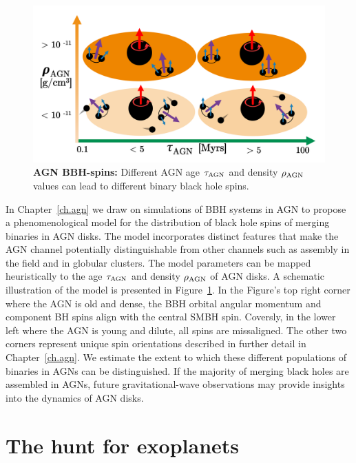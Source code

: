 \begin{figure}
\begin{center}
  \centerline{\includegraphics[width=1.\linewidth]{src/figures/agn_spins.png}}
  \caption{\textbf{AGN BBH-spins:} Different AGN age $\tau_{\rm AGN}$ and density $\rho_{\rm AGN}$ values can lead to different binary black hole spins. }
  \label{fig:agn_spins}
\end{center}
\end{figure}


In Chapter~\ref{ch.agn} we draw on simulations of BBH systems in AGN to propose a phenomenological model for the distribution of black hole spins of merging binaries in AGN disks. 
The model incorporates distinct features that make the AGN channel potentially distinguishable from other channels such as assembly in the field and in globular clusters. 
The model parameters can be mapped heuristically to the age $\tau_{\rm AGN}$ and density $\rho_{\rm AGN}$ of AGN disks. 
A schematic illustration of the model is presented in Figure~\ref{fig:agn_spins}. 
In the Figure's top right corner where the AGN is old and dense, the BBH orbital angular momentum and component BH spins align with the central SMBH spin. 
Coversly, in the lower left where the AGN is young and dilute, all spins are missaligned. The other two corners represent unique spin orientations described in further detail in Chapter~\ref{ch.agn}.
We estimate the extent to which these different populations of binaries in AGNs can be distinguished.
If the majority of merging black holes are assembled in AGNs, future gravitational-wave observations may provide insights into the dynamics of AGN disks.

\section{The hunt for exoplanets}

